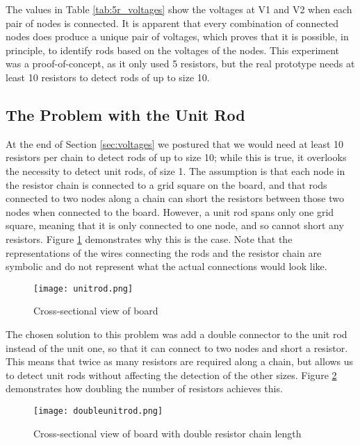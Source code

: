 The values in Table \ref{tab:5r_voltages} show the voltages at V1 and V2 when each pair of nodes is connected. It is apparent that every combination of connected nodes does produce a unique pair of voltages, which proves that it is possible, in principle, to identify rods based on the voltages of the nodes. This experiment was a proof-of-concept, as it only used 5 resistors, but the real prototype needs at least 10 resistors to detect rods of up to size 10.

\subsection{The Problem with the Unit Rod}

At the end of Section \ref{sec:voltages} we postured that we would need at least 10 resistors per chain to detect rods of up to size 10; while this is true, it overlooks the necessity to detect unit rods, of size 1. The assumption is that each node in the resistor chain is connected to a grid square on the board, and that rods connected to two nodes along a chain can short the resistors between those two nodes when connected to the board. However, a unit rod spans only one grid square, meaning that it is only connected to one node, and so cannot short any resistors. Figure \ref{fig:unitrod} demonstrates why this is the case. Note that the representations of the wires connecting the rods and the resistor chain are symbolic and do not represent what the actual connections would look like. 

\begin{figure}[H]
	\begin{center}
	\texttt{[image: unitrod.png]}\\ 
  	\caption{Cross-sectional view of board}
    \label{fig:unitrod}
    \end{center}
\end{figure}

The chosen solution to this problem was add a double connector to the unit rod instead of the unit one, so that it can connect to two nodes and short a resistor. This means that twice as many resistors are required along a chain, but allows us to detect unit rods without affecting the detection of the other sizes. Figure \ref{fig:doubleunitrod} demonstrates how doubling the number of resistors achieves this.

\begin{figure}[H]
	\begin{center}
	\texttt{[image: doubleunitrod.png]}\\ 
  	\caption{Cross-sectional view of board with double resistor chain length}
    \label{fig:doubleunitrod}
    \end{center}
\end{figure}

